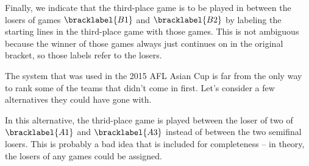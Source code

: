 {    Finally, we indicate that the third-place game is to be played in between the losers of games $\bracklabel{B1}$ and $\bracklabel{B2}$ by labeling the starting lines in the third-place game with those games. This is not ambiguous because the winner of those games always just continues on in the original bracket, so those labels refer to the losers.

    The system that was used in the 2015 AFL Asian Cup is far from the only way to rank some of the teams that didn't come in first. Let's consider a few alternatives they could have gone with.


    In this alternative, the thrid-place game is played between the loser of two of $\bracklabel{A1}$ and $\bracklabel{A3}$ instead of between the two semifinal losers. This is probably a bad idea that is included for completeness -- in theory, the losers of any games could be assigned.
}